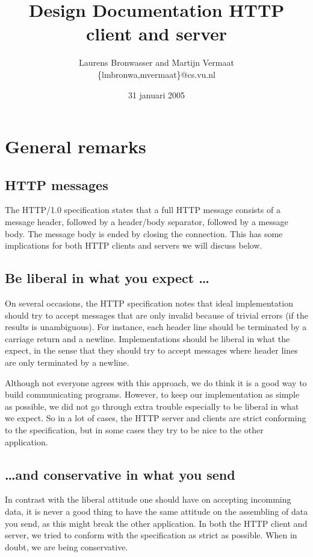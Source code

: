 \documentclass[11pt]{article}
\title{Design Documentation HTTP client and server}
\author{
    Laurens Bronwasser and Martijn Vermaat\\
    \{lmbronwa,mvermaat\}@cs.vu.nl
}
\date{31 januari 2005}
\begin{document}
\maketitle


\lstset{
  numbers=none,
  basicstyle=\small,
  frame=tb,
  language=Pascal,
  captionpos=b
}


\section{General remarks}


\subsection{HTTP messages}\label{sec:httpmessages}

The HTTP/1.0 specification states that a full HTTP message consists of a
message header, followed by a header/body separator, followed by a message
body. The message body is ended by closing the connection. This has some
implications for both HTTP clients and servers we will discuss below.


\subsection{Be liberal in what you expect \ldots}

On several occasions, the HTTP specification notes that ideal implementation
should try to accept messages that are only invalid because of trivial
errors (if the results is unambiguous). For instance, each header line should
be terminated by a carriage return and a newline. Implementations should be
liberal in what the expect, in the sense that they should try to accept
messages where header lines are only terminated by a newline.

Although not everyone agrees with this approach, we do think it is a good way
to build communicating programs. However, to keep our implementation as simple
as possible, we did not go through extra trouble especially to be liberal in
what we expect. So in a lot of cases, the HTTP server and clients are strict
conforming to the specification, but in some cases they try to be nice to the
other application.


\subsection{\ldots and conservative in what you send}

In contrast with the liberal attitude one should have on accepting incomming
data, it is never a good thing to have the same attitude on the assembling of
data you send, as this might break the other application. In both the HTTP
client and server, we tried to conform with the specification as strict as
possible. When in doubt, we are being conservative.
\end{document}
